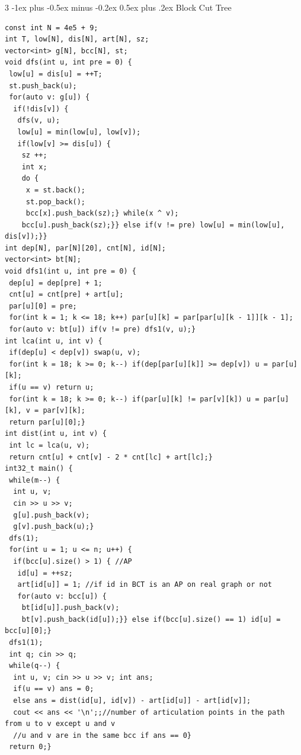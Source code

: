 \documentclass[8pt,a4paper,onesided]{article}
\makeatletter
\renewcommand{\subsection}{\@startsection{subsection}{2}{0mm}
    {-1ex plus -0.5ex minus -0.2ex} %
    {0.5ex plus .2ex}                %
    {\normalfont\large\bfseries}}    %
\makeatother
\begin{document}
\begin{multicols}{3}
\subsection{Block Cut Tree}
\begin{verbatim}
const int N = 4e5 + 9;
int T, low[N], dis[N], art[N], sz;
vector<int> g[N], bcc[N], st;
void dfs(int u, int pre = 0) {
 low[u] = dis[u] = ++T;
 st.push_back(u);
 for(auto v: g[u]) {
  if(!dis[v]) {
   dfs(v, u);
   low[u] = min(low[u], low[v]);
   if(low[v] >= dis[u]) {
    sz ++;
    int x;
    do {
     x = st.back();
     st.pop_back();
     bcc[x].push_back(sz);} while(x ^ v);
    bcc[u].push_back(sz);}} else if(v != pre) low[u] = min(low[u], dis[v]);}}
int dep[N], par[N][20], cnt[N], id[N];
vector<int> bt[N];
void dfs1(int u, int pre = 0) {
 dep[u] = dep[pre] + 1;
 cnt[u] = cnt[pre] + art[u];
 par[u][0] = pre;
 for(int k = 1; k <= 18; k++) par[u][k] = par[par[u][k - 1]][k - 1];
 for(auto v: bt[u]) if(v != pre) dfs1(v, u);}
int lca(int u, int v) {
 if(dep[u] < dep[v]) swap(u, v);
 for(int k = 18; k >= 0; k--) if(dep[par[u][k]] >= dep[v]) u = par[u][k];
 if(u == v) return u;
 for(int k = 18; k >= 0; k--) if(par[u][k] != par[v][k]) u = par[u][k], v = par[v][k];
 return par[u][0];}
int dist(int u, int v) {
 int lc = lca(u, v);
 return cnt[u] + cnt[v] - 2 * cnt[lc] + art[lc];}
int32_t main() {
 while(m--) {
  int u, v;
  cin >> u >> v;
  g[u].push_back(v);
  g[v].push_back(u);}
 dfs(1);
 for(int u = 1; u <= n; u++) {
  if(bcc[u].size() > 1) { //AP
   id[u] = ++sz;
   art[id[u]] = 1; //if id in BCT is an AP on real graph or not
   for(auto v: bcc[u]) {
    bt[id[u]].push_back(v);
    bt[v].push_back(id[u]);}} else if(bcc[u].size() == 1) id[u] = bcc[u][0];}
 dfs1(1);
 int q; cin >> q;
 while(q--) {
  int u, v; cin >> u >> v; int ans;
  if(u == v) ans = 0;
  else ans = dist(id[u], id[v]) - art[id[u]] - art[id[v]];
  cout << ans << '\n';;//number of articulation points in the path from u to v except u and v
  //u and v are in the same bcc if ans == 0}
 return 0;}
\end{verbatim}

\end{multicols}
\end{document}
